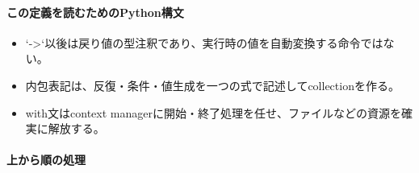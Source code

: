 \documentclass[a4paper,11pt]{article}
\begin{document}
            \paragraph{この定義を読むためのPython構文}
            \begin{itemize}[leftmargin=1.6em]
            \item `->`以後は戻り値の型注釈であり、実行時の値を自動変換する命令ではない。
\item 内包表記は、反復・条件・値生成を一つの式で記述してcollectionを作る。
\item with文はcontext managerに開始・終了処理を任せ、ファイルなどの資源を確実に解放する。
            \end{itemize}
            \paragraph{上から順の処理}
\end{document}
